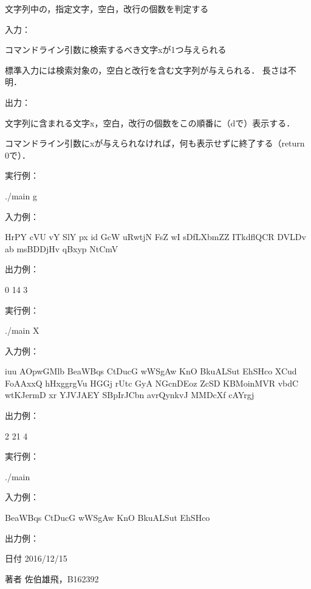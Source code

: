文字列中の，指定文字，空白，改行の個数を判定する 

入力：
\begin{DoxyItemize}
\item コマンドライン引数に検索するべき文字xが1つ与えられる
\item 標準入力には検索対象の，空白と改行を含む文字列が与えられる． 長さは不明．
\end{DoxyItemize}

出力：
\begin{DoxyItemize}
\item 文字列に含まれる文字x，空白，改行の個数をこの順番に（dで）表示する．
\item コマンドライン引数にxが与えられなければ，何も表示せずに終了する（return 0で）． \begin{DoxyVerb}実行例：
\end{DoxyVerb}
 \begin{DoxyVerb}./main g
\end{DoxyVerb}
 入力例： \begin{DoxyVerb}HrPY cVU vY SlY px id GcW uRwtjN
FsZ wI sDfLXbmZZ
ITkdflQCR DVLDv ab msBDDjHv qBxyp NtCmV
\end{DoxyVerb}
 出力例： \begin{DoxyVerb}0 14 3
\end{DoxyVerb}
 実行例： \begin{DoxyVerb}./main X
\end{DoxyVerb}
 入力例： \begin{DoxyVerb}iuu AOpwGMlb
BeaWBqs CtDucG wWSgAw KnO BkuALSut EhSHco
XCud FoAAxxQ hHxggrgVu HGGj rUtc GyA NGcnDEoz ZcSD KBMoinMVR
vbdC wtKJermD xr YJVJAEY SBpIrJCbn avrQynkvJ MMDcXf cAYrgj
\end{DoxyVerb}
 出力例： \begin{DoxyVerb}2 21 4
\end{DoxyVerb}
 実行例： \begin{DoxyVerb}./main
\end{DoxyVerb}
 入力例： \begin{DoxyVerb}BeaWBqs CtDucG wWSgAw KnO BkuALSut EhSHco
\end{DoxyVerb}
 出力例： \begin{DoxyVerb}\end{DoxyVerb}
 \begin{DoxyDate}{日付}
2016/12/15 
\end{DoxyDate}
\begin{DoxyAuthor}{著者}
佐伯雄飛，\-B162392 
\end{DoxyAuthor}

\end{DoxyItemize}

